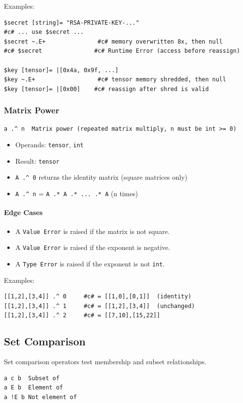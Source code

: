 Examples:
\begin{verbatim}
$secret [string]= "RSA-PRIVATE-KEY-..."
#c# ... use $secret ...
$secret ~.E+               #c# memory overwritten 8x, then null
#c# $secret               #c# Runtime Error (access before reassign)

$key [tensor]= |[0x4a, 0x9f, ...]
$key ~.E+                  #c# tensor memory shredded, then null
$key [tensor]= |[0x00]    #c# reassign after shred is valid
\end{verbatim}

\subsubsection{Matrix Power}
\begin{verbatim}
a .^ n  Matrix power (repeated matrix multiply, n must be int >= 0)
\end{verbatim}

\begin{itemize}
\item Operands: \texttt{tensor}, \texttt{int}
\item Result: \texttt{tensor}
\item \texttt{A .\^{} 0} returns the identity matrix (square matrices only)
\item \texttt{A .\^{} n} = \texttt{A .* A .* ... .* A} (n times)
\end{itemize}

\paragraph{Edge Cases}
\begin{itemize}
\item A \texttt{Value Error} is raised if the matrix is not square.
\item A \texttt{Value Error} is raised if the exponent is negative.
\item A \texttt{Type Error} is raised if the exponent is not \texttt{int}.
\end{itemize}

Examples:
\begin{verbatim}
[[1,2],[3,4]] .^ 0     #c# = [[1,0],[0,1]]  (identity)
[[1,2],[3,4]] .^ 1     #c# = [[1,2],[3,4]]  (unchanged)
[[1,2],[3,4]] .^ 2     #c# = [[7,10],[15,22]]
\end{verbatim}

\subsection{Set Comparison}
Set comparison operators test membership and subset relationships.
\begin{verbatim}
a c b  Subset of
a E b  Element of
a !E b Not element of
\end{verbatim}


